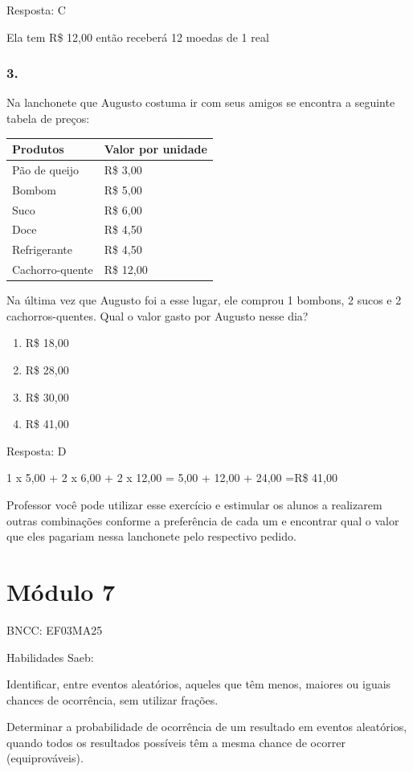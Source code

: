 Resposta: C

Ela tem R\$ 12,00 então receberá 12 moedas de 1 real

\subsubsection{3.}\label{section-94}

Na lanchonete que Augusto costuma ir com seus amigos se encontra a
seguinte tabela de preços:

\begin{longtable}[]{@{}ll@{}}
\toprule
Produtos & Valor por unidade\tabularnewline
\midrule
\endhead
Pão de queijo & R\$ 3,00\tabularnewline
Bombom & R\$ 5,00\tabularnewline
Suco & R\$ 6,00\tabularnewline
Doce & R\$ 4,50\tabularnewline
Refrigerante & R\$ 4,50\tabularnewline
Cachorro-quente & R\$ 12,00\tabularnewline
\bottomrule
\end{longtable}

Na última vez que Augusto foi a esse lugar, ele comprou 1 bombons, 2
sucos e 2 cachorros-quentes. Qual o valor gasto por Augusto nesse dia?

\begin{enumerate}
\def\labelenumi{\alph{enumi})}
\item
  R\$ 18,00
\item
  R\$ 28,00
\item
  R\$ 30,00
\item
  R\$ 41,00
\end{enumerate}

Resposta: D

1 x 5,00 + 2 x 6,00 + 2 x 12,00 = 5,00 + 12,00 + 24,00 =R\$ 41,00

Professor você pode utilizar esse exercício e estimular os alunos a
realizarem outras combinações conforme a preferência de cada um e
encontrar qual o valor que eles pagariam nessa lanchonete pelo
respectivo pedido.

\section{Módulo 7}\label{muxf3dulo-7}

BNCC: EF03MA25

Habilidades Saeb:

Identificar, entre eventos aleatórios, aqueles que têm menos, maiores ou
iguais chances de ocorrência, sem utilizar frações.

Determinar a probabilidade de ocorrência de um resultado em eventos
aleatórios, quando todos os resultados possíveis têm a mesma chance de
ocorrer (equiprováveis).

